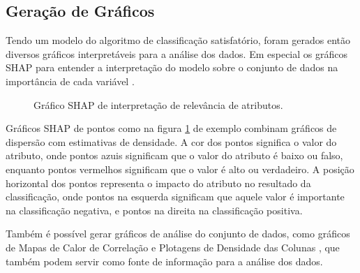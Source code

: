 \subsection{Geração de Gráficos}
\label{subsec:geracao-graficos}

Tendo um modelo do algoritmo de classificação satisfatório, foram gerados então diversos gráficos interpretáveis para a análise dos dados. Em especial os gráficos SHAP para entender a interpretação do modelo sobre o conjunto de dados na importância de cada variável \cite{shap}. 

\begin{figure}[ht!]
  \centering
  \caption{\textmd{Gráfico SHAP de interpretação de relevância de atributos.}}
  \label{fig:shap-exemplo}
\end{figure}

Gráficos SHAP de pontos como na figura \ref{fig:shap-exemplo} de exemplo combinam gráficos de dispersão com estimativas de densidade. A cor dos pontos significa o valor do atributo, onde pontos azuis significam que o valor do atributo é baixo ou falso, enquanto pontos vermelhos significam que o valor é alto ou verdadeiro. A posição horizontal dos pontos representa o impacto do atributo no resultado da classificação, onde pontos na esquerda significam que aquele valor é importante na classificação negativa, e pontos na direita na classificação positiva.


Também é possível gerar gráficos de análise do conjunto de dados, como gráficos de Mapas de Calor de Correlação \cite{correlation} e Plotagens de Densidade das Colunas \cite{density}, que também podem servir como fonte de informação para a análise dos dados.